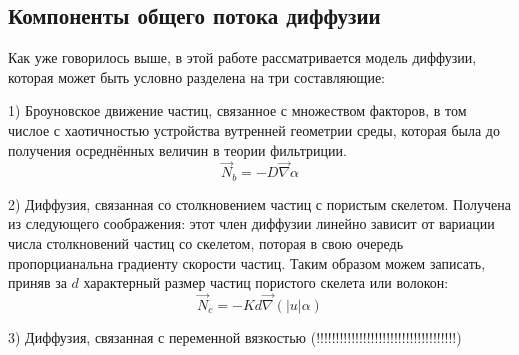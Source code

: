 \subsection{Компоненты общего потока диффузии}
\par Как уже говорилось выше, в этой работе рассматривается модель диффузии, которая может быть условно разделена на три составляющие:
\par 1) Броуновское движение частиц, связанное с множеством факторов, в том числое с хаотичностью устройства вутренней геометрии среды, которая была до получения осреднённых величин в теории фильтриции. $$\vec{N}_{b} = -D\vec{\nabla} \alpha$$
\par 2) Диффузия, связанная со столкновением частиц с пористым скелетом. Получена из следующего соображения: этот член диффузии линейно зависит от вариации числа столкновений частиц со скелетом, поторая в свою очередь пропорцианальна градиенту скорости частиц. Таким образом можем записать, приняв за $d$ характерный размер частиц пористого скелета или волокон:
$$\vec{N}_{c} = -Kd\vec{\nabla}(|u|\alpha)$$
\par 3) Диффузия, связанная с переменной вязкостью (!!!!!!!!!!!!!!!!!!!!!!!!!!!!!!!!!!!!)

